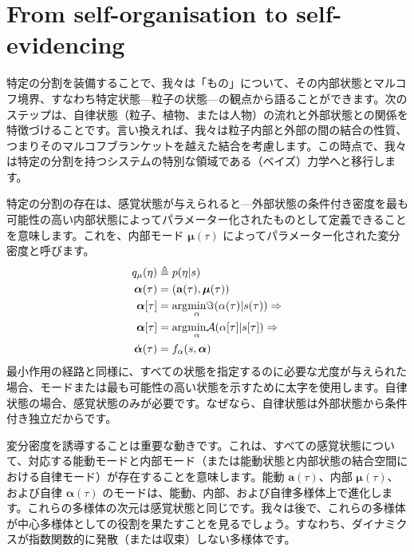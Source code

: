 \documentclass[a4paper, titlepage]{jsarticle}
\begin{document}
\section{From self-organisation to self-evidencing}
特定の分割を装備することで、我々は「もの」について、その内部状態とマルコフ境界、すなわち特定状態—粒子の状態—の観点から語ることができます。次のステップは、自律状態（粒子、植物、または人物）の流れと外部状態との関係を特徴づけることです。言い換えれば、我々は粒子内部と外部の間の結合の性質、つまりそのマルコフブランケットを越えた結合を考慮します。この時点で、我々は特定の分割を持つシステムの特別な領域である（ベイズ）力学へと移行します。
\par
特定の分割の存在は、感覚状態が与えられると—外部状態の条件付き密度を最も可能性の高い内部状態によってパラメーター化されたものとして定義できることを意味します。これを、内部モード $\bm{\mu}(\tau)$ によってパラメーター化された変分密度と呼びます。
\begin{equation}\label{variational_density}
    \begin{aligned}
        q_{\mu}(\eta)&\triangleq p(\eta | s) \\
        \bm{\alpha}(\tau) &= (\mathbf{a}(\tau), \bm{\mu}(\tau)) \\
        \bm{\alpha}[\tau] &= \mathrm{arg}\underset{\alpha}{\operatorname{min}}\imaginary(\alpha(\tau) | s(\tau)) \Rightarrow \\
        \bm{\alpha}[\tau] &= \mathrm{arg}\underset{\alpha}{\operatorname{min}}\mathcal{A}(\alpha[\tau] |s[\tau]) \Rightarrow \\
        \dot{\bm{\alpha}}(\tau) &= f_\alpha(s, \bm{\alpha})
    \end{aligned}
\end{equation}
最小作用の経路と同様に、すべての状態を指定するのに必要な尤度が与えられた場合、モードまたは最も可能性の高い状態を示すために太字を使用します。自律状態の場合、感覚状態のみが必要です。なぜなら、自律状態は外部状態から条件付き独立だからです。
\par
変分密度を誘導することは重要な動きです。これは、すべての感覚状態について、対応する能動モードと内部モード（または能動状態と内部状態の結合空間における自律モード）が存在することを意味します。能動 $\mathbf{a}(\tau)$、内部 $\bm{\mu}(\tau)$、および自律 $\bm{\alpha}(\tau)$ のモードは、能動、内部、および自律多様体上で進化します。これらの多様体の次元は感覚状態と同じです。我々は後で、これらの多様体が中心多様体としての役割を果たすことを見るでしょう。すなわち、ダイナミクスが指数関数的に発散（または収束）しない多様体です。
\par
\end{document}
